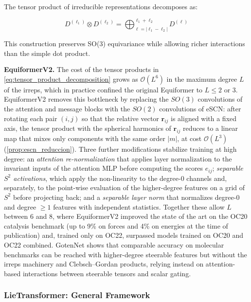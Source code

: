 The tensor product of irreducible representations decomposes as:

\begin{equation}
    D^{(\ell_1)} \otimes D^{(\ell_2)} = \bigoplus_{\ell=|\ell_1-\ell_2|}^{\ell_1+\ell_2} D^{(\ell)}
    \label{eq:tensor_product_decomposition}
\end{equation}

This construction preserves SO(3) equivariance while allowing richer interactions than the simple dot product.

\textbf{EquiformerV2.} The cost of the tensor products in \eqref{eq:tensor_product_decomposition} grows as $\mathcal{O}(L^6)$ in the maximum degree $L$ of the irreps, which in practice confined the original Equiformer to $L \leq 2$ or $3$. EquiformerV2 \citep{liao2024equiformerv2} removes this bottleneck by replacing the $SO(3)$ convolutions of the attention and message blocks with the $SO(2)$ convolutions of eSCN: after rotating each pair $(i,j)$ so that the relative vector $\mathbf{r}_{ij}$ is aligned with a fixed axis, the tensor product with the spherical harmonics of $\mathbf{r}_{ij}$ reduces to a linear map that mixes only components with the same order $|m|$, at cost $\mathcal{O}(L^3)$ (\autoref{prop:escn_reduccion}). Three further modifications stabilize training at high degree: an \emph{attention re-normalization} that applies layer normalization to the invariant inputs of the attention \gls{MLP} before computing the scores $e_{ij}$; \emph{separable $S^2$ activations}, which apply the non-linearity to the degree-0 channels and, separately, to the point-wise evaluation of the higher-degree features on a grid of $S^2$ before projecting back; and a \emph{separable layer norm} that normalizes degree-0 and degree $\geq 1$ features with independent statistics. Together these allow $L$ between 6 and 8, where EquiformerV2 improved the state of the art on the OC20 catalysis benchmark (up to 9\% on forces and 4\% on energies at the time of publication) and, trained only on OC22, surpassed models trained on OC20 and OC22 combined. GotenNet \citep{aykent2025gotennet} shows that comparable accuracy on molecular benchmarks can be reached with higher-degree steerable features but without the irreps machinery and Clebsch--Gordan products, relying instead on attention-based interactions between steerable tensors and scalar gating.

\subsubsection{Lie\gls{Transformer}: General Framework}

